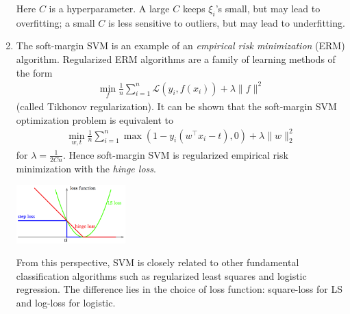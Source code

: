 \documentclass[10pt]{article}
\begin{document}
\begin{multicols}{2}
\begin{addmargin}[0.8em]{0.5em}
\begin{enumerate}[label=(\alph*)]
        Here $C$ is a hyperparameter. A large $C$ keeps $\xi_i$'s small, but may lead to overfitting; a small $C$ is less sensitive to outliers, but may lead to underfitting.
        
        \item The soft-margin SVM is an example of an \textit{empirical risk minimization} (ERM) algorithm. Regularized ERM algorithms are a family of learning methods of the form
        \begin{align*}
            \min_f \frac{1}{n} \sum_{i=1}^{n} \mathcal{L}(y_i, f(x_i)) + \lambda \| f \|^2
        \end{align*}
        (called Tikhonov regularization). It can be shown that the soft-margin SVM optimization problem is equivalent to
        \begin{align*}
            \min_{w,t} \frac{1}{n} \sum_{i=1}^{n} \max(1 - y_i(w^\top x_i - t), 0) + \lambda \|w\|_2^2
        \end{align*}
        for $\lambda=\frac{1}{2Cn}$. Hence soft-margin SVM is regularized empirical risk minimization with the \textit{hinge loss}.
        \begin{center}
            \includegraphics[width=4.2cm]{erm.png}
        \end{center}
        From this perspective, SVM is closely related to other fundamental classification algorithms such as regularized least squares and logistic regression. The difference lies in the choice of loss function: square-loss for LS and log-loss for logistic.
        

\end{enumerate}
\end{addmargin}
\end{multicols}
\end{document}
